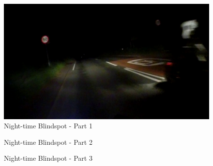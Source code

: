\documentclass[12pt]{report} %
\begin{document}
		\begin{figure}[ht]
			\centering
			\includegraphics[width=.74\columnwidth]{Figures/scenarios/blindspot_night_t1/Night_BST1-191.jpg}
			\caption{Night-time Blindspot - Part 1}
			\label{fig:ntBlindspotP1}
		\end{figure}

		\begin{figure}[hb]
			\begin{floatrow}
				{
					\caption{Night-time Blindspot - Part 2}
					\label{fig:ntBlindspotP2}
				}
			
				{
					\caption{Night-time Blindspot - Part 3}
					\label{fig:ntBlindspotP3}
				}
			\end{floatrow}
		\end{figure}
\end{document}
